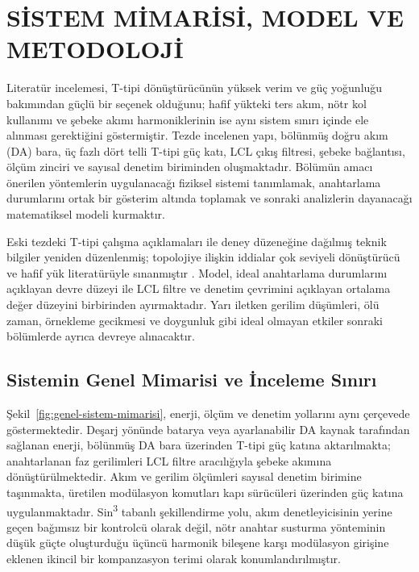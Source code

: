 \chapter{SİSTEM MİMARİSİ, MODEL VE METODOLOJİ}
\label{chap:sistem}


Literatür incelemesi, T-tipi dönüştürücünün yüksek verim ve güç yoğunluğu bakımından güçlü bir seçenek olduğunu; hafif yükteki ters akım, nötr kol kullanımı ve şebeke akımı harmoniklerinin ise aynı sistem sınırı içinde ele alınması gerektiğini göstermiştir. Tezde incelenen yapı, bölünmüş doğru akım (DA) bara, üç fazlı dört telli T-tipi güç katı, LCL çıkış filtresi, şebeke bağlantısı, ölçüm zinciri ve sayısal denetim biriminden oluşmaktadır. Bölümün amacı önerilen yöntemlerin uygulanacağı fiziksel sistemi tanımlamak, anahtarlama durumlarını ortak bir gösterim altında toplamak ve sonraki analizlerin dayanacağı matematiksel modeli kurmaktır.

Eski tezdeki T-tipi çalışma açıklamaları ile deney düzeneğine dağılmış teknik bilgiler yeniden düzenlenmiş; topolojiye ilişkin iddialar çok seviyeli dönüştürücü ve hafif yük literatürüyle sınanmıştır \citep{Mohan2003,Holmes2003,Schweizer2013,Wang2020,Chen2010}. Model, ideal anahtarlama durumlarını açıklayan devre düzeyi ile LCL filtre ve denetim çevrimini açıklayan ortalama değer düzeyini birbirinden ayırmaktadır. Yarı iletken gerilim düşümleri, ölü zaman, örnekleme gecikmesi ve doygunluk gibi ideal olmayan etkiler sonraki bölümlerde ayrıca devreye alınacaktır.

\section{Sistemin Genel Mimarisi ve İnceleme Sınırı}

Şekil~\ref{fig:genel-sistem-mimarisi}, enerji, ölçüm ve denetim yollarını aynı çerçevede göstermektedir. Deşarj yönünde batarya veya ayarlanabilir DA kaynak tarafından sağlanan enerji, bölünmüş DA bara üzerinden T-tipi güç katına aktarılmakta; anahtarlanan faz gerilimleri LCL filtre aracılığıyla şebeke akımına dönüştürülmektedir. Akım ve gerilim ölçümleri sayısal denetim birimine taşınmakta, üretilen modülasyon komutları kapı sürücüleri üzerinden güç katına uygulanmaktadır. Sin\textsuperscript{3} tabanlı şekillendirme yolu, akım denetleyicisinin yerine geçen bağımsız bir kontrolcü olarak değil, nötr anahtar susturma yönteminin düşük güçte oluşturduğu üçüncü harmonik bileşene karşı modülasyon girişine eklenen ikincil bir kompanzasyon terimi olarak konumlandırılmıştır.

